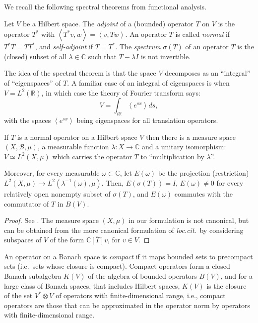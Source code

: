 We recall the following spectral theorems from functional analysis. 

Let $V$ be a Hilbert space. The \emph{adjoint} of a (bounded) operator $T$ on $V$ is the operator $T^*$ with $\left<  T^*v,w\right>=\left<  v,Tw\right>$. An operator $T$ is called \emph{normal} if $T^* T = T T^*$, and \emph{self-adjoint} if $T=T^*$. The \emph{spectrum} $\sigma(T)$ of an operator $T$ is the (closed) subset of all $\lambda\in \mathbb C$ such that $T-\lambda I$ is not invertible. 

The idea of the spectral theorem is that the space $V$ decomposes as an ``integral'' of ``eigenspaces'' of $T$. A familiar case of an integral of eigenspaces is when $V=L^2(\mathbb R)$, in which case the theory of Fourier transform says:
$$V= \int_{i\mathbb R} \left< e^{sx}\right> ds,$$
with the spaces $\left< e^{sx}\right>$ being eigenspaces for all translation operators. 

\begin{theorem}
\label{theorem-spectraltheorem-normal}
 If $T$ is a normal operator on a Hilbert space $V$ then there is a measure space $(X,\mathcal B,\mu)$, a measurable function $\lambda: X\to \mathbb C$ and a unitary isomorphism: $V \simeq L^2(X,\mu)$ which carries the operator $T$ to ``multiplication by $\lambda$''.
 
 Moreover, for every measurable $\omega\subset \mathbb C$, let $E(\omega)$ be the projection (restriction) $L^2(X,\mu) \to L^2(\lambda^{-1}(\omega),\mu)$. Then, $E(\sigma(T))=I$, $E(\omega)\ne 0$ for every relatively open nonempty subset of $\sigma(T)$, and $E(\omega)$ commutes with the commutator of $T$ in $B(V)$.
\end{theorem}

\begin{proof}
 See \cite[Theorem 12.23]{Rudin}. The measure space $(X,\mu)$ in our formulation is not canonical, but can be obtained from the more canonical formulation of \emph{loc.cit}.\ by considering subspaces of $V$ of the form $\overline{\mathbb C[T]v}$, for $v\in V$. 
\end{proof}


An operator on a Banach space is \emph{compact} if it maps bounded sets to precompact sets (i.e.\ sets whose closure is compact). Compact operators form a closed Banach subalgebra $K(V)$ of the algebra of bounded operators $B(V)$, and for a large class of Banach spaces, that includes Hilbert spaces, $K(V)$ is the closure of the set $V^*\otimes V$ of operators with finite-dimensional range, i.e., compact operators are those that can be approximated in the operator norm by operators with finite-dimensional range. 

